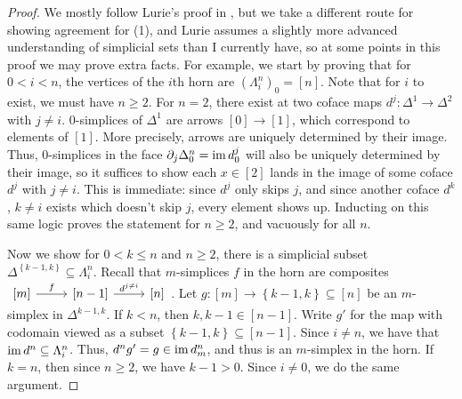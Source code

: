 \begin{proof}
	We mostly follow Lurie's proof in \cite[Prop.~1.1.2.2]{htt}, but we take a different route for showing agreement for (1), and Lurie assumes a slightly more advanced understanding of simplicial sets than I currently have, so at some points in this proof we may prove extra facts. For example, we start by proving that for $0<i<n$, the vertices of the $i$th horn are $\left( \Lambda_i^n \right)_0=[n]$. Note that for $i$ to exist, we must have $n\geq 2$. For $n=2$, there exist at two coface maps $d^j : \Delta^1 \to \Delta^2$ with $j\neq i$. 0-simplices of $\Delta^1$ are arrows $[0]\to [1]$, which correspond to elements of $[1]$. More precisely, arrows are uniquely determined by their image. Thus, 0-simplices in the face $\partial _j\Delta^n_0=\operatorname{im} d^j_0$ will also be uniquely determined by their image, so it suffices to show each $x\in[2]$ lands in the image of some coface $d^j$ with $j\neq i$. This is immediate: since $d^j$ only skips $j$, and since another coface $d^k$, $k\neq i$ exists which doesn't skip $j$, every element shows up. Inducting on this same logic proves the statement for $n\geq 2$, and vacuously for all $n$.

	Now we show for $0<k\leq n$ and $n\geq 2$, there is a simplicial subset $\Delta^{\left\{ k-1,k \right\} } \subseteq \Lambda_i^n$. Recall that $m$-simplices $f$ in the horn are composites $\begin{tikzcd}[row sep = 2.5em, column sep = 2.5em]
		{[m]}\ar[" f", r]  & {[n-1]}\ar[" d^{j\neq i}  ", r]  & {[n]}
	\end{tikzcd}$. Let $g : [m] \to \left\{ k-1,k \right\} \subseteq [n]$ be an $m$-simplex in $\Delta^{k-1,k} $. If $k<n$, then $k,k-1\in[n-1]$. Write $g'$ for the map with codomain viewed as a subset $\left\{ k-1,k \right\} \subseteq [n-1]$. Since $i\neq n$, we have that $\operatorname{im} d^n \subseteq \Lambda_i^n$. Thus, $d^ng'=g\in\operatorname{im} d^n_m$, and thus is an $m$-simplex in the horn. If $k=n$, then since $n\geq 2$, we have $k-1>0$. Since $i\neq 0$, we do the same argument.


\end{proof}
